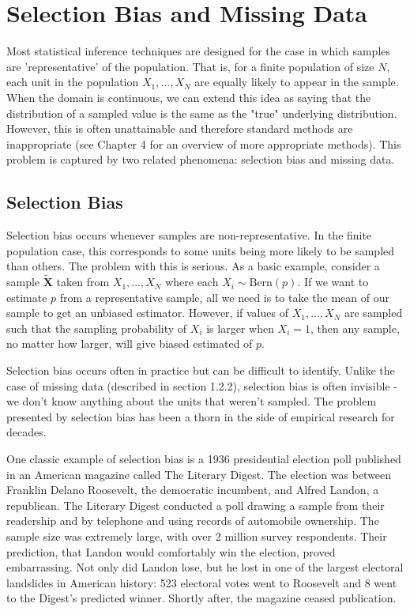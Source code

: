\documentclass[12pt,twoside]{reedthesis}
\theoremstyle{definition}
\begin{document}
\section{Selection Bias and Missing Data}

Most statistical inference techniques  are designed for the case in which samples are 'representative' of the population. That is, for a finite population of size $N$, each unit in the population $X_1, ..., X_N$ are equally likely to appear in the sample. When the domain is continuous, we can extend this idea as saying that the distribution of a sampled value is the same as the "true" underlying distribution. However, this is often unattainable and therefore standard methods are inappropriate (see Chapter 4 for an overview of more appropriate methods). This problem is captured by two related phenomena: selection bias and missing data.


\subsection{Selection Bias}

Selection bias occurs whenever samples are non-representative. In the finite population case, this corresponds to some units being more likely to be sampled than others. The problem with this is serious. As a basic example, consider a sample $\tilde{\mathbf{X}}$ taken from $X_1, ..., X_N$ where each $X_i \sim \text{Bern}(p)$. If we want to estimate $p$ from a representative sample, all we need is to take the mean of our sample to get an unbiased estimator. However, if values of $X_1, ..., X_N$ are sampled such that the sampling probability of $X_i$ is larger when $X_i = 1$, then any sample, no matter how larger, will give biased estimated of $p$. 

Selection bias occurs often in practice but can be difficult to identify. Unlike the case of missing data (described in section 1.2.2), selection bias is often invisible - we don't know anything about the units that weren't sampled. The problem presented by selection bias has been a thorn in the side of empirical research for decades.

One classic example of selection bias is a 1936 presidential election poll  published in an American magazine called The Literary Digest. The election was between Franklin Delano Roosevelt, the democratic incumbent, and Alfred Landon, a republican. The Literary Digest conducted a poll drawing a sample from their readership and by telephone and using records of automobile ownership. The sample size was extremely large, with over 2 million survey respondents. Their prediction, that Landon would comfortably win the election, proved embarrassing. Not only did Landon lose, but he lost in one of the largest electoral landslides in American history:  523 electoral votes went to Roosevelt and 8 went to the Digest's predicted winner. Shortly after, the magazine ceased publication.
\end{document}
